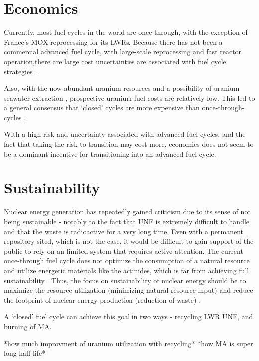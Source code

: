 \section{Economics}
Currently, most fuel cycles in the world are once-through,
with the exception of France's \gls{MOX} reprocessing for its
\glspl{LWR}. Because there has not been a commercial advanced
fuel cycle, with large-scale reprocessing and fast reactor
operation,there are large cost uncertainties are associated
with fuel cycle strategies \cite{d._e._shropshire_advanced_2009}.

Also, with the now abundant uranium resources and a possibility
of uranium seawater extraction \cite{tabushi_extraction_1979},
prospective uranium fuel costs are relatively
low. This led to a general consensus that `closed' cycles are
more expensive than once-through-cycles
\cite{d._e._shropshire_advanced_2009, bunn_economics_2005, charpin_economic_2000}.

With a high risk and uncertainty associated with advanced fuel cycles,
and the fact that taking the risk to transition may cost more,
economics does not seem to be a dominant incentive for transitioning
into an advanced fuel cycle.

\section{Sustainability}
Nuclear energy generation has repeatedly gained criticism due to its
sense of not being sustainable - notably to the fact that \gls{UNF}
is extremely difficult to handle and that the waste is radioactive
for a very long time. Even with a permanent repository sited,
which is not the case, it would be difficult to gain support of the
public to rely on an limited system that requires active attention.
 The current once-through
fuel cycle does not optimize the consumption of a natural resource
and utilize energetic materials like the actinides, which is far
from achieving full sustainability \cite{poinssot_recycling_2012}.
Thus, the focus on sustainability of nuclear energy should be
to maximize the resource utilization (minimizing natural resource
input) and reduce the footprint of nuclear energy production
(reduction of waste) \cite{poinssot_assessment_2014}.

A `closed' fuel cycle can achieve this goal in two ways -
recycling \gls{LWR} \gls{UNF}, and burning of \gls{MA}.

*how much improvment of uranium utilization with recycling*
*how MA is super long half-life*